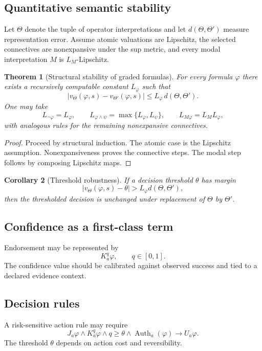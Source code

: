 \documentclass[11pt]{article}
\newtheorem{theorem}{Theorem}[section]
\newtheorem{corollary}[theorem]{Corollary}
\theoremstyle{definition}
\theoremstyle{remark}
\newcommand{\Auth}{\operatorname{Auth}}
\begin{document}
\subsection{Quantitative semantic stability}

Let \(\Theta\) denote the tuple of operator interpretations and let \(d(\Theta,\Theta')\) measure representation error. Assume atomic valuations are Lipschitz, the selected connectives are nonexpansive under the sup metric, and every modal interpretation \(M\) is \(L_M\)-Lipschitz.

\begin{theorem}[Structural stability of graded formulas]
For every formula \(\varphi\) there exists a recursively computable constant \(L_\varphi\) such that
\[
\left|
 v_\Theta(\varphi,s)-v_{\Theta'}(\varphi,s)
\right|
\le
L_\varphi\,d(\Theta,\Theta').
\]
One may take
\[
L_{\neg\varphi}=L_\varphi,
\qquad
L_{\varphi\wedge\psi}=\max\{L_\varphi,L_\psi\},
\qquad
L_{M\varphi}=L_ML_\varphi,
\]
with analogous rules for the remaining nonexpansive connectives.
\end{theorem}

\begin{proof}
Proceed by structural induction. The atomic case is the Lipschitz assumption. Nonexpansiveness proves the connective steps. The modal step follows by composing Lipschitz maps.
\end{proof}

\begin{corollary}[Threshold robustness]
If a decision threshold \(\theta\) has margin
\[
\left|v_\Theta(\varphi,s)-\theta\right|
>
L_\varphi d(\Theta,\Theta'),
\]
then the thresholded decision is unchanged under replacement of \(\Theta\) by \(\Theta'\).
\end{corollary}

\subsection{Confidence as a first-class term}

Endorsement may be represented by
\[
K_a^q\varphi,
\qquad q\in[0,1].
\]
The confidence value should be calibrated against observed success and tied to a declared evidence context.

\subsection{Decision rules}

A risk-sensitive action rule may require
\[
J_a\varphi
\wedge
K_a^q\varphi
\wedge
q\ge\theta
\wedge
\Auth_a(\varphi)
\to
U_a\varphi.
\]
The threshold \(\theta\) depends on action cost and reversibility.
\end{document}

